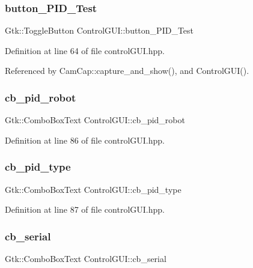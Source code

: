 \subsubsection{\texorpdfstring{button\+\_\+\+P\+I\+D\+\_\+\+Test}{button\_PID\_Test}}
{\footnotesize\ttfamily Gtk\+::\+Toggle\+Button Control\+G\+U\+I\+::button\+\_\+\+P\+I\+D\+\_\+\+Test}



Definition at line 64 of file control\+G\+U\+I.\+hpp.



Referenced by Cam\+Cap\+::capture\+\_\+and\+\_\+show(), and Control\+G\+U\+I().

\mbox{\label{class_control_g_u_i_a3c7845eb8c0bddab5a9aa88fb9b8bd58}} 
\subsubsection{\texorpdfstring{cb\+\_\+pid\+\_\+robot}{cb\_pid\_robot}}
{\footnotesize\ttfamily Gtk\+::\+Combo\+Box\+Text Control\+G\+U\+I\+::cb\+\_\+pid\+\_\+robot}



Definition at line 86 of file control\+G\+U\+I.\+hpp.

\mbox{\label{class_control_g_u_i_a8d26d0b3dae9b5ec2a36c9249739588d}} 
\subsubsection{\texorpdfstring{cb\+\_\+pid\+\_\+type}{cb\_pid\_type}}
{\footnotesize\ttfamily Gtk\+::\+Combo\+Box\+Text Control\+G\+U\+I\+::cb\+\_\+pid\+\_\+type}



Definition at line 87 of file control\+G\+U\+I.\+hpp.

\mbox{\label{class_control_g_u_i_a730f792c7de4d8c3cd4c933876d8bc52}} 
\subsubsection{\texorpdfstring{cb\+\_\+serial}{cb\_serial}}
{\footnotesize\ttfamily Gtk\+::\+Combo\+Box\+Text Control\+G\+U\+I\+::cb\+\_\+serial}



